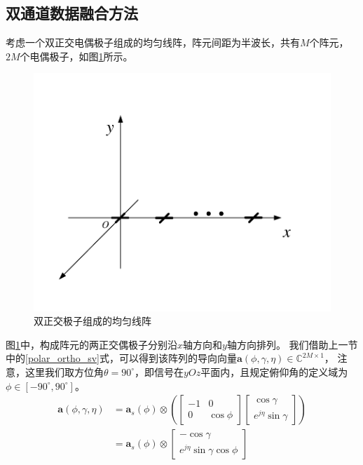 \documentclass[master]{thesis-uestc}
\begin{document}
\subsection{双通道数据融合方法}
考虑一个双正交电偶极子组成的均匀线阵，阵元间距为半波长，共有$M$个阵元，$2M$个电偶极子，如图\ref{dual_ortho_ULA_fig}所示。
\begin{figure}[h]
    \includegraphics[scale=0.8]{pic/dual_ortho_ULA.pdf}
    \caption{双正交极子组成的均匀线阵}
    \label{dual_ortho_ULA_fig}
\end{figure}
图\ref{dual_ortho_ULA_fig}中，构成阵元的两正交偶极子分别沿$x$轴方向和$y$轴方向排列。
我们借助上一节中的\eqref{polar_ortho_sv}式，可以得到该阵列的导向向量$\bm{a}(\phi,\gamma,\eta)\in\mathbb{C}^{2M\times1}$，
注意，这里我们取方位角$\theta=90^\circ$，即信号在$yOz$平面内，且规定俯仰角的定义域为$\phi\in\left[-90^\circ,90^\circ\right]$。
\begin{equation}\label{dual_ortho_ULA_sv}
    \begin{aligned}
        \bm{a}(\phi,\gamma,\eta) &= 
        \bm{a}_s(\phi) \otimes 
        \left(
            \begin{bmatrix}
                -1 & 0 \\
                0 & \cos\phi
            \end{bmatrix}
            \begin{bmatrix}
                \cos\gamma \\ e^{j\eta}\sin\gamma
            \end{bmatrix}
        \right) \\
        &=
        \bm{a}_s(\phi) \otimes 
        \begin{bmatrix}
            -\cos\gamma \\ e^{j\eta}\sin\gamma\cos\phi    
        \end{bmatrix}
    \end{aligned}
\end{equation}
\end{document}
